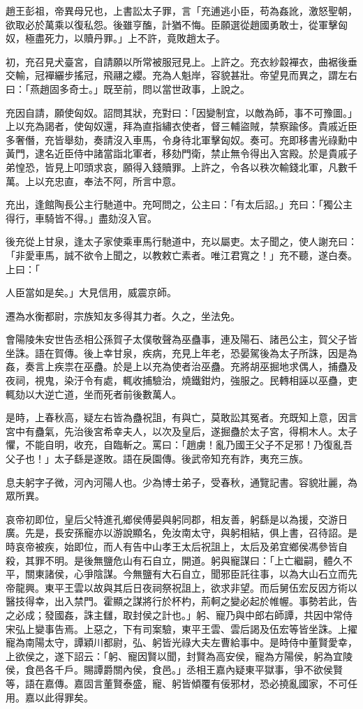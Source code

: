 \begin{pinyinscope}
趙王彭祖，帝異母兄也，上書訟太子罪，言「充逋逃小臣，苟為姦訛，激怒聖朝，欲取必於萬乘以復私怨。後雖亨醢，計猶不悔。臣願選從趙國勇敢士，從軍擊匈奴，極盡死力，以贖丹罪。」上不許，竟敗趙太子。

初，充召見犬臺宮，自請願以所常被服冠見上。上許之。充衣紗縠襌衣，曲裾後垂交輸，冠襌纚步搖冠，飛翮之纓。充為人魁岸，容貌甚壯。帝望見而異之，謂左右曰：「燕趙固多奇士。」既至前，問以當世政事，上說之。

充因自請，願使匈奴。詔問其狀，充對曰：「因變制宜，以敵為師，事不可豫圖。」上以充為謁者，使匈奴還，拜為直指繡衣使者，督三輔盜賊，禁察踰侈。貴戚近臣多奢僭，充皆舉劾，奏請沒入車馬，令身待北軍擊匈奴。奏可。充即移書光祿勳中黃門，逮名近臣侍中諸當詣北軍者，移劾門衛，禁止無令得出入宮殿。於是貴戚子弟惶恐，皆見上叩頭求哀，願得入錢贖罪。上許之，令各以秩次輸錢北軍，凡數千萬。上以充忠直，奉法不阿，所言中意。

充出，逢館陶長公主行馳道中。充呵問之，公主曰：「有太后詔。」充曰：「獨公主得行，車騎皆不得。」盡劾沒入官。

後充從上甘泉，逢太子家使乘車馬行馳道中，充以屬吏。太子聞之，使人謝充曰：「非愛車馬，誠不欲令上聞之，以教敕亡素者。唯江君寬之！」充不聽，遂白奏。上曰：「

人臣當如是矣。」大見信用，威震京師。

遷為水衡都尉，宗族知友多得其力者。久之，坐法免。

會陽陵朱安世告丞相公孫賀子太僕敬聲為巫蠱事，連及陽石、諸邑公主，賀父子皆坐誅。語在賀傳。後上幸甘泉，疾病，充見上年老，恐晏駕後為太子所誅，因是為姦，奏言上疾祟在巫蠱。於是上以充為使者治巫蠱。充將胡巫掘地求偶人，捕蠱及夜祠，視鬼，染汙令有處，輒收捕驗治，燒鐵鉗灼，強服之。民轉相誣以巫蠱，吏輒劾以大逆亡道，坐而死者前後數萬人。

是時，上春秋高，疑左右皆為蠱祝詛，有與亡，莫敢訟其冤者。充既知上意，因言宮中有蠱氣，先治後宮希幸夫人，以次及皇后，遂掘蠱於太子宮，得桐木人。太子懼，不能自明，收充，自臨斬之。罵曰：「趙虜！亂乃國王父子不足邪！乃復亂吾父子也！」太子繇是遂敗。語在戾園傳。後武帝知充有詐，夷充三族。

息夫躬字子微，河內河陽人也。少為博士弟子，受春秋，通覽記書。容貌壯麗，為眾所異。

哀帝初即位，皇后父特進孔鄉侯傅晏與躬同郡，相友善，躬繇是以為援，交游日廣。先是，長安孫寵亦以游說顯名，免汝南太守，與躬相結，俱上書，召待詔。是時哀帝被疾，始即位，而人有告中山孝王太后祝詛上，太后及弟宜鄉侯馮參皆自殺，其罪不明。是後無鹽危山有石自立，開道。躬與寵謀曰：「上亡繼嗣，體久不平，關東諸侯，心爭陰謀。今無鹽有大石自立，聞邪臣託往事，以為大山石立而先帝龍興。東平王雲以故與其后日夜祠祭祝詛上，欲求非望。而后舅伍宏反因方術以醫技得幸，出入禁門。霍顯之謀將行於杯杓，荊軻之變必起於帷幄。事勢若此，告之必成；發國姦，誅主讎，取封侯之計也。」躬、寵乃與中郎右師譚，共因中常侍宋弘上變事告焉。上惡之，下有司案驗，東平王雲、雲后謁及伍宏等皆坐誅。上擢寵為南陽太守，譚穎川都尉，弘、躬皆光祿大夫左曹給事中。是時侍中董賢愛幸，上欲侯之，遂下詔云：「躬、寵因賢以聞，封賢為高安侯，寵為方陽侯，躬為宜陵侯，食邑各千戶。賜譚爵關內侯，食邑。」丞相王嘉內疑東平獄事，爭不欲侯賢等，語在嘉傳。嘉固言董賢泰盛，寵、躬皆傾覆有佞邪材，恐必撓亂國家，不可任用。嘉以此得罪矣。


\end{pinyinscope}
